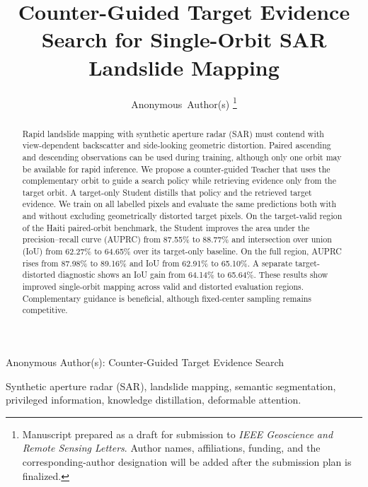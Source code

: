 \documentclass[journal]{IEEEtran}
\begin{document}
\title{Counter-Guided Target Evidence Search for Single-Orbit SAR Landslide Mapping}

\author{Anonymous~Author(s)%
\thanks{Manuscript prepared as a draft for submission to \emph{IEEE Geoscience and Remote Sensing Letters}. Author names, affiliations, funding, and the corresponding-author designation will be added after the submission plan is finalized.}}

%
{Anonymous Author(s): Counter-Guided Target Evidence Search}

\maketitle

\begin{abstract}
Rapid landslide mapping with synthetic aperture radar (SAR) must contend with view-dependent backscatter and side-looking geometric distortion. Paired ascending and descending observations can be used during training, although only one orbit may be available for rapid inference. We propose a counter-guided Teacher that uses the complementary orbit to guide a search policy while retrieving evidence only from the target orbit. A target-only Student distills that policy and the retrieved target evidence. We train on all labelled pixels and evaluate the same predictions both with and without excluding geometrically distorted target pixels. On the target-valid region of the Haiti paired-orbit benchmark, the Student improves the area under the precision--recall curve (AUPRC) from 87.55\% to 88.77\% and intersection over union (IoU) from 62.27\% to 64.65\% over its target-only baseline. On the full region, AUPRC rises from 87.98\% to 89.16\% and IoU from 62.91\% to 65.10\%. A separate target-distorted diagnostic shows an IoU gain from 64.14\% to 65.64\%. These results show improved single-orbit mapping across valid and distorted evaluation regions. Complementary guidance is beneficial, although fixed-center sampling remains competitive.
\end{abstract}

\begin{IEEEkeywords}
Synthetic aperture radar (SAR), landslide mapping, semantic segmentation, privileged information, knowledge distillation, deformable attention.
\end{IEEEkeywords}


\clearpage




\FloatBarrier
\balance

{\scriptsize


}
\end{document}
